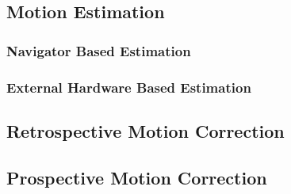 \documentclass[class=article, crop=false]{standalone}
\begin{document}
\subsection{Motion Estimation}

\subsubsection*{Navigator Based Estimation}

\subsubsection*{External Hardware Based Estimation}

\subsection{Retrospective Motion Correction}

\subsection{Prospective Motion Correction}
\end{document}
